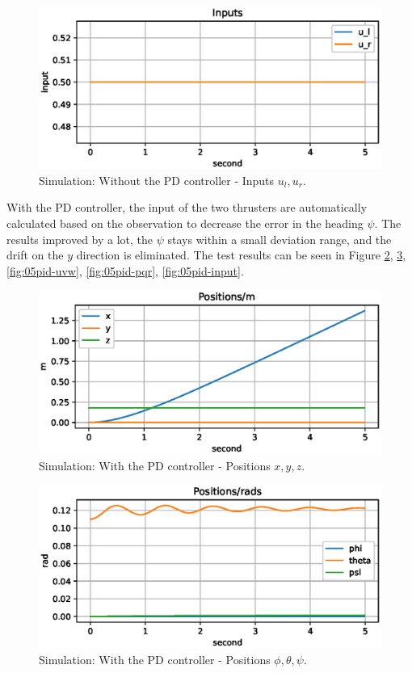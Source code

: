 \begin{figure}[ht]
    \centering
    \includegraphics[width=.8\textwidth]{images/05nopid-test-input.eps}
    \caption{Simulation: Without the PD controller - Inputs $u_l, u_r$.}
    \label{fig:05nopid-input}
\end{figure}

With the PD controller, the input of the two thrusters are automatically calculated based on the observation to decrease the error in the heading $\psi$. The results improved by a lot, the $\psi$ stays within a small deviation range, and the drift on the $y$ direction is eliminated. The test results can be seen in Figure \ref{fig:05pid-xyz}, \ref{fig:05pid-ptp}, \ref{fig:05pid-uvw}, \ref{fig:05pid-pqr}, \ref{fig:05pid-input}.

\begin{figure}[H]
    \centering
    \includegraphics[width=.8\textwidth]{images/05pid-test-xyz.eps}
    \caption{Simulation: With the PD controller - Positions $x, y, z$.}
    \label{fig:05pid-xyz}
\end{figure}

\begin{figure}[H]
    \centering
    \includegraphics[width=.8\textwidth]{images/05pid-test-ptp.eps}
    \caption{Simulation: With the PD controller - Positions $\phi, \theta, \psi$.}
    \label{fig:05pid-ptp}
\end{figure}

